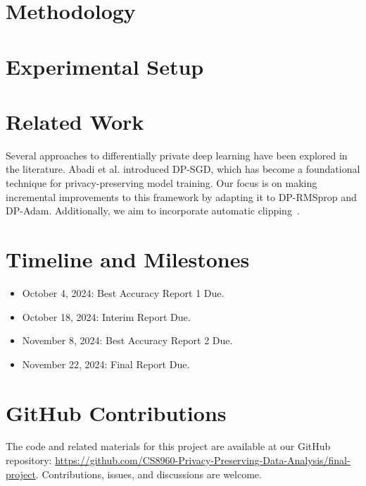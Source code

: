 \documentclass{article}
\begin{document}
    \section{Methodology}\label{sec:methodology}
    

    \break
    \section{Experimental Setup}\label{sec:experimental-setup}
    

    \section{Related Work}\label{sec:related-work}
    Several approaches to differentially private deep learning have been explored in the literature.
    Abadi et al. \cite{Abadi_2016_DeepLearningDifferentialPrivacy} introduced DP-SGD, which has become a foundational technique for
    privacy-preserving model training.
    Our focus is on making incremental improvements to this framework by adapting it to DP-RMSprop and DP-Adam.
    Additionally, we aim to incorporate automatic clipping~\cite{bu2023automaticclippingdifferentiallyprivate}.


    \section{Timeline and Milestones}\label{sec:timeline-and-milestones}
    \begin{itemize}
        \item October 4, 2024: Best Accuracy Report 1 Due.
        \item October 18, 2024: Interim Report Due.
        \item November 8, 2024: Best Accuracy Report 2 Due.
        \item November 22, 2024: Final Report Due.
    \end{itemize}


    
    


    \section*{GitHub Contributions}
    The code and related materials for this project are available at our GitHub repository:
    \url{https://github.com/CS8960-Privacy-Preserving-Data-Analysis/final-project}.
    Contributions, issues, and discussions are welcome.
\end{document}
